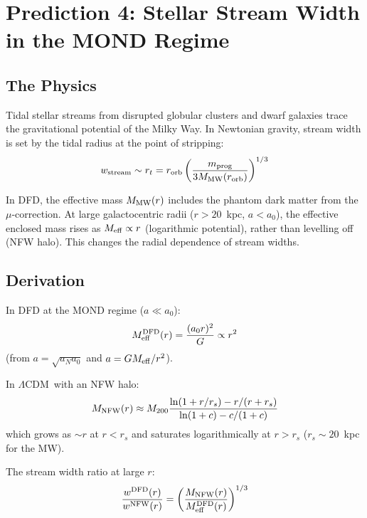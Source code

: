 \documentclass[11pt]{article}
\newcommand{\LCDM}{$\Lambda$CDM}
\begin{document}
\section{Prediction 4: Stellar Stream Width in the MOND Regime}
\label{sec:streams}

\subsection{The Physics}

Tidal stellar streams from disrupted globular clusters and dwarf galaxies
trace the gravitational potential of the Milky Way.  In Newtonian gravity,
stream width is set by the tidal radius at the point of stripping:
\begin{equation}
w_{\rm stream} \sim r_t = r_{\rm orb}\left(\frac{m_{\rm prog}}{3M_{\rm MW}(r_{\rm orb})}\right)^{1/3}
\end{equation}

In DFD, the effective mass $M_{\rm MW}(r)$ includes the phantom dark
matter from the $\mu$-correction.  At large galactocentric radii
($r > 20$~kpc, $a < a_0$), the effective enclosed mass rises as
$M_{\rm eff} \propto r$ (logarithmic potential), rather than levelling
off (NFW halo).  This changes the radial dependence of stream widths.

\subsection{Derivation}

In DFD at the MOND regime ($a \ll a_0$):
\begin{equation}
M_{\rm eff}^{\rm DFD}(r) = \frac{(a_0 r)^2}{G} \propto r^2
\end{equation}
(from $a = \sqrt{a_N a_0}$ and $a = GM_{\rm eff}/r^2$).

In \LCDM\ with an NFW halo:
\begin{equation}
M_{\rm NFW}(r) \approx M_{200}\frac{\ln(1+r/r_s) - r/(r+r_s)}
{\ln(1+c) - c/(1+c)}
\end{equation}
which grows as $\sim r$ at $r < r_s$ and saturates logarithmically at
$r > r_s$ ($r_s \sim 20$~kpc for the MW).

The stream width ratio at large $r$:
\begin{equation}
\frac{w^{\rm DFD}(r)}{w^{\rm NFW}(r)}
= \left(\frac{M_{\rm NFW}(r)}{M_{\rm eff}^{\rm DFD}(r)}\right)^{1/3}
\end{equation}
\end{document}
